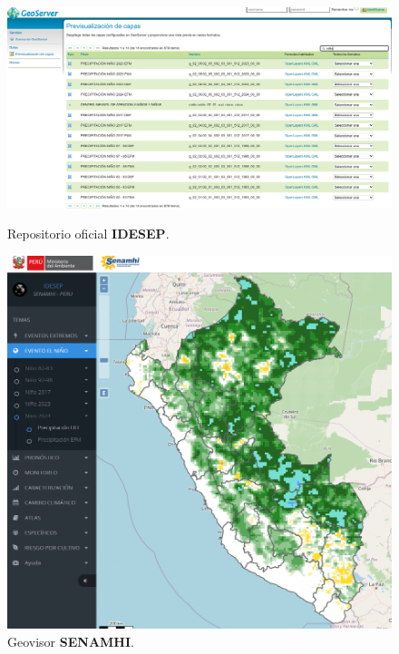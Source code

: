 \documentclass{article}
\begin{document}
\begin{figure}[ht]
  \centering
  \begin{minipage}{0.45\textwidth}
      \centering
      \includegraphics[width=\textwidth]{./assets/Geoserver_IDESEP.png}
      \caption{Repositorio oficial \textbf{IDESEP}.}
  \end{minipage}
  \hfill
  \begin{minipage}{0.45\textwidth}
      \centering
      \includegraphics[width=\textwidth]{./assets/Geovisor.png}
      \caption{Geovisor \textbf{SENAMHI}.}
  \end{minipage}
  \label{fig:2}
\end{figure}

\newpage
\end{document}
